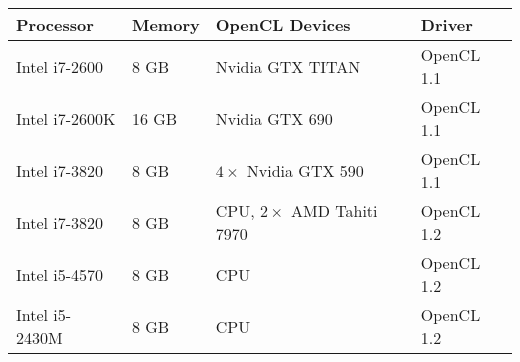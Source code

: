 \begin{tabular}{llll}
\toprule
      Processor & Memory &                  OpenCL Devices &      Driver \\
\midrule
  Intel i7-2600 &   8 GB &                Nvidia GTX TITAN &  OpenCL 1.1 \\
 Intel i7-2600K &  16 GB &                  Nvidia GTX 690 &  OpenCL 1.1 \\
  Intel i7-3820 &   8 GB &        $4\times$ Nvidia GTX 590 &  OpenCL 1.1 \\
  Intel i7-3820 &   8 GB &  CPU, $2\times$ AMD Tahiti 7970 &  OpenCL 1.2 \\
  Intel i5-4570 &   8 GB &                             CPU &  OpenCL 1.2 \\
 Intel i5-2430M &   8 GB &                             CPU &  OpenCL 1.2 \\
\bottomrule
\end{tabular}

